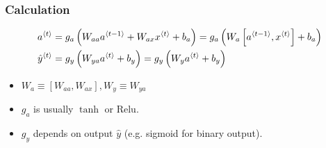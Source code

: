 \subsubsection{Calculation}
\begin{align*}
a^{\left\langle t\right\rangle}&=g_a\left(W_{aa}a^{\left\langle t-1\right\rangle}+W_{ax}x^{\left\langle t\right\rangle}+b_a\right)=g_a\left(W_{a}\left[a^{\left\langle t-1\right\rangle}, x^{\left\langle t\right\rangle}\right]+b_a\right)\\
\hat{y}^{\left\langle t\right\rangle}&=g_y\left(W_{ya}a^{\left\langle t\right\rangle}+b_y\right)=g_y\left(W_{y}a^{\left\langle t\right\rangle}+b_y\right)
\end{align*}
\begin{itemize}
\item $W_a\equiv\left[W_{aa}, W_{ax}\right], W_y\equiv W_{ya}$
\item $g_a$ is usually $\tanh$ or Relu.
\item $g_y$ depends on output $\hat{y}$ (e.g. sigmoid for binary output).
\end{itemize}
